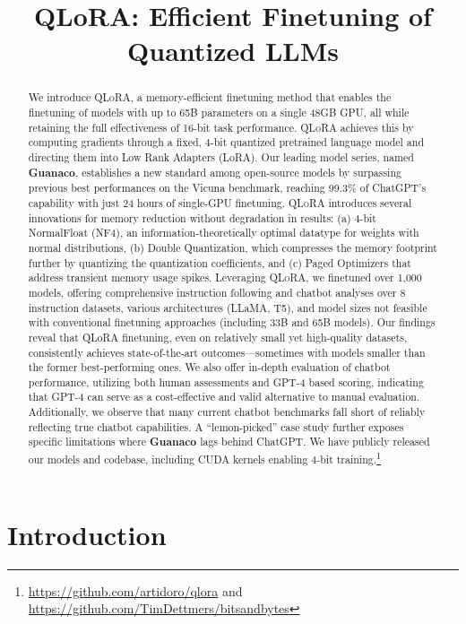 \title{QLoRA: Efficient Finetuning of Quantized LLMs}

\begin{abstract}
We introduce \textsc{QLoRA}, a memory-efficient finetuning method that enables the finetuning of models with up to 65B parameters on a single 48GB GPU, all while retaining the full effectiveness of 16-bit task performance. \textsc{QLoRA} achieves this by computing gradients through a fixed, 4-bit quantized pretrained language model and directing them into Low Rank Adapters (LoRA). Our leading model series, named \textbf{Guanaco}, establishes a new standard among open-source models by surpassing previous best performances on the Vicuna benchmark, reaching 99.3\% of ChatGPT’s capability with just 24 hours of single-GPU finetuning. \textsc{QLoRA} introduces several innovations for memory reduction without degradation in results: (a) 4-bit NormalFloat (NF4), an information-theoretically optimal datatype for weights with normal distributions, (b) Double Quantization, which compresses the memory footprint further by quantizing the quantization coefficients, and (c) Paged Optimizers that address transient memory usage spikes. Leveraging \textsc{QLoRA}, we finetuned over 1,000 models, offering comprehensive instruction following and chatbot analyses over 8 instruction datasets, various architectures (LLaMA, T5), and model sizes not feasible with conventional finetuning approaches (including 33B and 65B models). Our findings reveal that QLoRA finetuning, even on relatively small yet high-quality datasets, consistently achieves state-of-the-art outcomes—sometimes with models smaller than the former best-performing ones. We also offer in-depth evaluation of chatbot performance, utilizing both human assessments and GPT-4 based scoring, indicating that GPT-4 can serve as a cost-effective and valid alternative to manual evaluation. Additionally, we observe that many current chatbot benchmarks fall short of reliably reflecting true chatbot capabilities. A “lemon-picked” case study further exposes specific limitations where \textbf{Guanaco} lags behind ChatGPT. We have publicly released our models and codebase, including CUDA kernels enabling 4-bit training.\footnote{\url{https://github.com/artidoro/qlora} and \url{https://github.com/TimDettmers/bitsandbytes}}
\end{abstract}

\section{Introduction}

